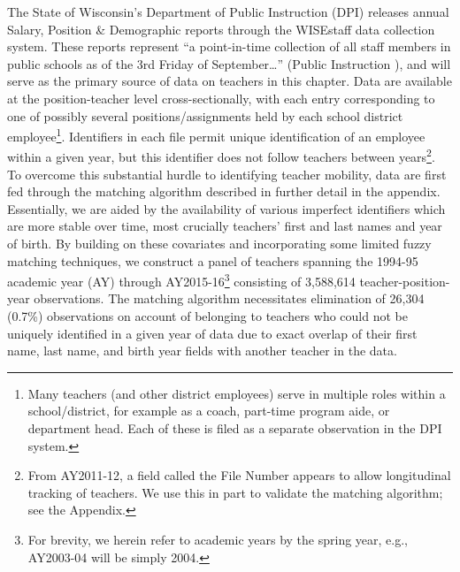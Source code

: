 The State of Wisconsin's Department of Public Instruction (DPI) releases
annual Salary, Position \& Demographic reports through the WISEstaff
data collection system. These reports represent ``a point-in-time
collection of all staff members in public schools as of the 3rd Friday
of September\ldots{}'' (Public Instruction
\citeyear{dpi}), and
will serve as the primary source of data on teachers in this chapter. Data
are available at the position-teacher level cross-sectionally, with each
entry corresponding to one of possibly several positions/assignments
held by each school district employee\footnote{Many teachers (and other
  district employees) serve in multiple roles within a school/district,
  for example as a coach, part-time program aide, or department head.
  Each of these is filed as a separate observation in the DPI system.}.
Identifiers in each file permit unique identification of an employee
within a given year, but this identifier does not follow teachers
between years\footnote{From AY2011-12, a field called the File Number
  appears to allow longitudinal tracking of teachers. We use this in
  part to validate the matching algorithm; see the Appendix.}. To
overcome this substantial hurdle to identifying teacher mobility, data
are first fed through the matching algorithm described in further detail
in the appendix. Essentially, we are aided by the availability of
various imperfect identifiers which are more stable over time, most
crucially teachers' first and last names and year of birth. By building
on these covariates and incorporating some limited fuzzy matching
techniques, we construct a panel of teachers spanning the 1994-95
academic year (AY) through AY2015-16\footnote{For brevity, we herein
  refer to academic years by the spring year, e.g., AY2003-04 will be
  simply 2004.} consisting of 3,588,614 teacher-position-year
observations. The matching algorithm necessitates elimination of 26,304
(0.7\%) observations on account of belonging to teachers who could not
be uniquely identified in a given year of data due to exact overlap of
their first name, last name, and birth year fields with another teacher
in the data.

